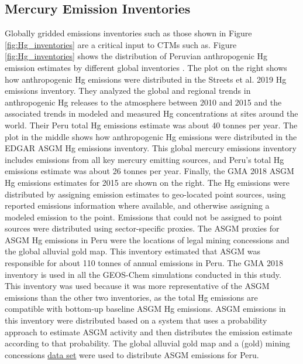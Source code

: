 \subsection{Mercury Emission Inventories}
\begin{flushleft}


Globally gridded emissions inventories such as those shown in Figure \ref{fig:Hg_inventories} are a critical input to CTMs such as\gc. Figure \ref{fig:Hg_inventories} shows the distribution of Peruvian anthropogenic Hg emission estimates by different global inventories \cite{united_nations_environment_programme_technical_2019,steenhuisen_development_2019,muntean_evaluating_2018,streets_global_2019}. The plot on the right shows how anthropogenic Hg emissions were distributed in the  Streets et al. 2019 Hg emissions inventory\cite{streets_global_2019}. They analyzed the global and regional trends in anthropogenic Hg releases to the atmosphere between 2010 and 2015 and the associated trends in modeled and measured Hg concentrations at sites around the world. Their Peru total Hg emissions estimate was about 40 tonnes per year. The plot in the middle shows how anthropogenic Hg emissions were distributed in the EDGAR ASGM Hg emissions inventory\cite{muntean_evaluating_2018}. This global mercury emissions inventory includes emissions from all key mercury emitting sources, and Peru's total Hg emissions estimate was about 26 tonnes per year. Finally, the GMA 2018 ASGM Hg emissions estimates for 2015 are shown on the right. The Hg emissions were distributed by assigning emission estimates to geo-located point sources, using reported emissions information where available, and otherwise assigning a modeled emission to the point. Emissions that could not be assigned to point sources were distributed using sector-specific proxies. The ASGM proxies for ASGM Hg emissions in Peru were the locations of legal mining concessions and the global alluvial gold map. This inventory estimated that ASGM was responsible for about 110 tonnes of annual emissions in Peru. The GMA 2018 inventory is used in all the GEOS-Chem simulations conducted in this study. This inventory was used because it was more representative of the ASGM emissions than the other two inventories, as the total Hg emissions are compatible with bottom-up baseline ASGM Hg emissions. ASGM emissions in this inventory were distributed based on a system that uses a probability approach to estimate ASGM activity and then distributes the emission estimate according to that probability\cite{steenhuisen_development_2019}. The global alluvial gold map and a (gold) mining concessions  \href{(https://data.globalforestwatch.org/search?collection=Dataset&q=mining)}{data set} were used to distribute ASGM emissions for Peru. 
\end{flushleft}
